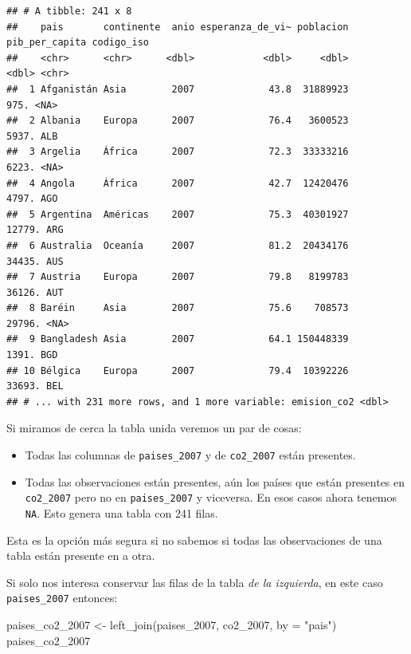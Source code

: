 \documentclass[
  openany]{book}
\newenvironment{Shaded}{\begin{snugshade}}{\end{snugshade}}
\newcommand{\AttributeTok}[1]{\textcolor[rgb]{0.77,0.63,0.00}{#1}}
\newcommand{\FunctionTok}[1]{\textcolor[rgb]{0.00,0.00,0.00}{#1}}
\newcommand{\NormalTok}[1]{#1}
\newcommand{\OtherTok}[1]{\textcolor[rgb]{0.56,0.35,0.01}{#1}}
\newcommand{\StringTok}[1]{\textcolor[rgb]{0.31,0.60,0.02}{#1}}
\providecommand{\tightlist}{%
  \setlength{\itemsep}{0pt}\setlength{\parskip}{0pt}}
\begin{document}
\begin{verbatim}
## # A tibble: 241 x 8
##    pais       continente  anio esperanza_de_vi~ poblacion pib_per_capita codigo_iso
##    <chr>      <chr>      <dbl>            <dbl>     <dbl>          <dbl> <chr>     
##  1 Afganistán Asia        2007             43.8  31889923           975. <NA>      
##  2 Albania    Europa      2007             76.4   3600523          5937. ALB       
##  3 Argelia    África      2007             72.3  33333216          6223. <NA>      
##  4 Angola     África      2007             42.7  12420476          4797. AGO       
##  5 Argentina  Américas    2007             75.3  40301927         12779. ARG       
##  6 Australia  Oceanía     2007             81.2  20434176         34435. AUS       
##  7 Austria    Europa      2007             79.8   8199783         36126. AUT       
##  8 Baréin     Asia        2007             75.6    708573         29796. <NA>      
##  9 Bangladesh Asia        2007             64.1 150448339          1391. BGD       
## 10 Bélgica    Europa      2007             79.4  10392226         33693. BEL       
## # ... with 231 more rows, and 1 more variable: emision_co2 <dbl>
\end{verbatim}

Si miramos de cerca la tabla unida veremos un par de cosas:

\begin{itemize}
\tightlist
\item
  Todas las columnas de \texttt{paises\_2007} y de \texttt{co2\_2007} están presentes.
\item
  Todas las observaciones están presentes, aún los países que están presentes en \texttt{co2\_2007} pero no en \texttt{paises\_2007} y viceversa. En esos casos ahora tenemos \texttt{NA}. Esto genera una tabla con 241 filas.
\end{itemize}

Esta es la opción más segura si no sabemos si todas las observaciones de una tabla están presente en a otra.

Si solo nos interesa conservar las filas de la tabla \emph{de la izquierda}, en este caso \texttt{paises\_2007} entonces:

\begin{Shaded}
\begin{Highlighting}[]
\NormalTok{paises\_co2\_2007 }\OtherTok{\textless{}{-}} \FunctionTok{left\_join}\NormalTok{(paises\_2007, co2\_2007, }\AttributeTok{by =} \StringTok{"pais"}\NormalTok{)}
\NormalTok{paises\_co2\_2007}
\end{Highlighting}
\end{Shaded}
\end{document}
